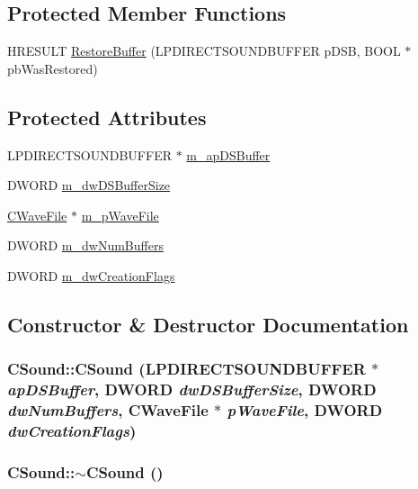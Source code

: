 \subsection*{Protected Member Functions}
\begin{DoxyCompactItemize}
\item 
HRESULT \hyperlink{class_c_sound_ab74aca2529b37470e7dcb7bc4eadbdbc}{RestoreBuffer} (LPDIRECTSOUNDBUFFER pDSB, BOOL $\ast$pbWasRestored)
\end{DoxyCompactItemize}
\subsection*{Protected Attributes}
\begin{DoxyCompactItemize}
\item 
LPDIRECTSOUNDBUFFER $\ast$ \hyperlink{class_c_sound_aad77495aa3800132a4f2fde0a9467b1f}{m\_\-apDSBuffer}
\item 
DWORD \hyperlink{class_c_sound_a69bdf453a29ab40f8b7fb2eecc026820}{m\_\-dwDSBufferSize}
\item 
\hyperlink{class_c_wave_file}{CWaveFile} $\ast$ \hyperlink{class_c_sound_aa8a1f977f2acf3049096d3b74f75e500}{m\_\-pWaveFile}
\item 
DWORD \hyperlink{class_c_sound_ac224963b022a2ee97ca30d872f9a1927}{m\_\-dwNumBuffers}
\item 
DWORD \hyperlink{class_c_sound_a0787066767c1f65d7b9cd2179513d7d8}{m\_\-dwCreationFlags}
\end{DoxyCompactItemize}


\subsection{Constructor \& Destructor Documentation}
\hypertarget{class_c_sound_aa9aaa0a90651513608392e520a19bedf}{
\subsubsection[{CSound}]{\setlength{\rightskip}{0pt plus 5cm}CSound::CSound (LPDIRECTSOUNDBUFFER $\ast$ {\em apDSBuffer}, \/  DWORD {\em dwDSBufferSize}, \/  DWORD {\em dwNumBuffers}, \/  {\bf CWaveFile} $\ast$ {\em pWaveFile}, \/  DWORD {\em dwCreationFlags})}}
\label{class_c_sound_aa9aaa0a90651513608392e520a19bedf}
\hypertarget{class_c_sound_afe00e938f0c637e80ae2e3d30faa5add}{
\subsubsection[{$\sim$CSound}]{\setlength{\rightskip}{0pt plus 5cm}CSound::$\sim$CSound ()}}
\label{class_c_sound_afe00e938f0c637e80ae2e3d30faa5add}


